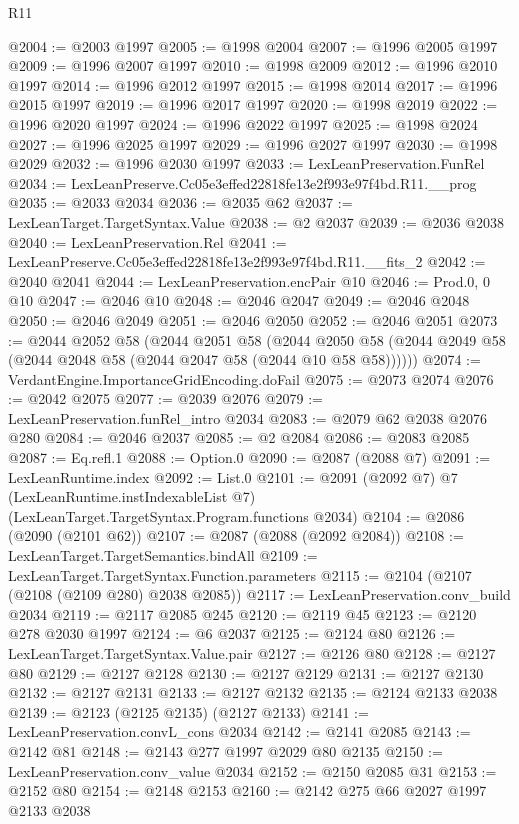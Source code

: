 \begin{lexlean}{R11}
\begin{coremodule}
@2004 := @2003 @1997
@2005 := @1998 @2004
@2007 := @1996 @2005 @1997
@2009 := @1996 @2007 @1997
@2010 := @1998 @2009
@2012 := @1996 @2010 @1997
@2014 := @1996 @2012 @1997
@2015 := @1998 @2014
@2017 := @1996 @2015 @1997
@2019 := @1996 @2017 @1997
@2020 := @1998 @2019
@2022 := @1996 @2020 @1997
@2024 := @1996 @2022 @1997
@2025 := @1998 @2024
@2027 := @1996 @2025 @1997
@2029 := @1996 @2027 @1997
@2030 := @1998 @2029
@2032 := @1996 @2030 @1997
@2033 := LexLeanPreservation.FunRel
@2034 := LexLeanPreserve.Cc05e3effed22818fe13e2f993e97f4bd.R11.__prog
@2035 := @2033 @2034
@2036 := @2035 @62
@2037 := LexLeanTarget.TargetSyntax.Value
@2038 := @2 @2037
@2039 := @2036 @2038
@2040 := LexLeanPreservation.Rel
@2041 := LexLeanPreserve.Cc05e3effed22818fe13e2f993e97f4bd.R11.__fits_2
@2042 := @2040 @2041
@2044 := LexLeanPreservation.encPair @10
@2046 := Prod.{0, 0} @10
@2047 := @2046 @10
@2048 := @2046 @2047
@2049 := @2046 @2048
@2050 := @2046 @2049
@2051 := @2046 @2050
@2052 := @2046 @2051
@2073 := @2044
    @2052
    @58
    (@2044
      @2051
      @58
      (@2044 @2050 @58 (@2044 @2049 @58 (@2044 @2048 @58 (@2044 @2047 @58 (@2044 @10 @58 @58))))))
@2074 := VerdantEngine.ImportanceGridEncoding.doFail
@2075 := @2073 @2074
@2076 := @2042 @2075
@2077 := @2039 @2076
@2079 := LexLeanPreservation.funRel_intro @2034
@2083 := @2079 @62 @2038 @2076 @280
@2084 := @2046 @2037
@2085 := @2 @2084
@2086 := @2083 @2085
@2087 := Eq.refl.{1}
@2088 := Option.{0}
@2090 := @2087 (@2088 @7)
@2091 := LexLeanRuntime.index
@2092 := List.{0}
@2101 := @2091
    (@2092 @7)
    @7
    (LexLeanRuntime.instIndexableList @7)
    (LexLeanTarget.TargetSyntax.Program.functions @2034)
@2104 := @2086 (@2090 (@2101 @62))
@2107 := @2087 (@2088 (@2092 @2084))
@2108 := LexLeanTarget.TargetSemantics.bindAll
@2109 := LexLeanTarget.TargetSyntax.Function.parameters
@2115 := @2104 (@2107 (@2108 (@2109 @280) @2038 @2085))
@2117 := LexLeanPreservation.conv_build @2034
@2119 := @2117 @2085 @245
@2120 := @2119 @45
@2123 := @2120 @278 @2030 @1997
@2124 := @6 @2037
@2125 := @2124 @80
@2126 := LexLeanTarget.TargetSyntax.Value.pair
@2127 := @2126 @80
@2128 := @2127 @80
@2129 := @2127 @2128
@2130 := @2127 @2129
@2131 := @2127 @2130
@2132 := @2127 @2131
@2133 := @2127 @2132
@2135 := @2124 @2133 @2038
@2139 := @2123 (@2125 @2135) (@2127 @2133)
@2141 := LexLeanPreservation.convL_cons @2034
@2142 := @2141 @2085
@2143 := @2142 @81
@2148 := @2143 @277 @1997 @2029 @80 @2135
@2150 := LexLeanPreservation.conv_value @2034
@2152 := @2150 @2085 @31
@2153 := @2152 @80
@2154 := @2148 @2153
@2160 := @2142 @275 @66 @2027 @1997 @2133 @2038

\end{coremodule}
\end{lexlean}
